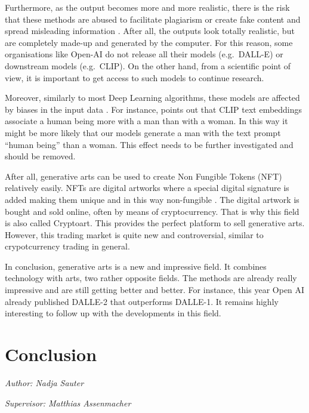 \documentclass[
]{krantz}
\begin{document}
Furthermore, as the output becomes more and more realistic, there is the risk that these methods are abused to facilitate plagiarism or create fake content and spread misleading information \citep{misconduct}. After all, the outputs look totally realistic, but are completely made-up and generated by the computer. For this reason, some organisations like Open-AI do not release all their models (e.g.~DALL-E) or downstream models (e.g.~CLIP). On the other hand, from a scientific point of view, it is important to get access to such models to continue research.

Moreover, similarly to most Deep Learning algorithms, these models are affected by biases in the input data \citep{bias_ML}. For instance, \citet{bias} points out that CLIP text embeddings associate a human being more with a man than with a woman. In this way it might be more likely that our models generate a man with the text prompt ``human being'' than a woman. This effect needs to be further investigated and should be removed.

After all, generative arts can be used to create Non Fungible Tokens (NFT) relatively easily. NFTs are digital artworks where a special digital signature is added making them unique and in this way non-fungible \citep{NFT}. The digital artwork is bought and sold online, often by means of cryptocurrency. That is why this field is also called Cryptoart. This provides the perfect platform to sell generative arts. However, this trading market is quite new and controversial, similar to crypotcurrency trading in general.

In conclusion, generative arts is a new and impressive field. It combines technology with arts, two rather opposite fields. The methods are already really impressive and are still getting better and better. For instance, this year Open AI already published DALLE-2 \citep{DALLE2} that outperforms DALLE-1. It remains highly interesting to follow up with the developments in this field.

\hypertarget{conclusion-1}{%
\chapter{Conclusion}\label{conclusion-1}}

\emph{Author: Nadja Sauter}

\emph{Supervisor: Matthias Assenmacher}
\end{document}
